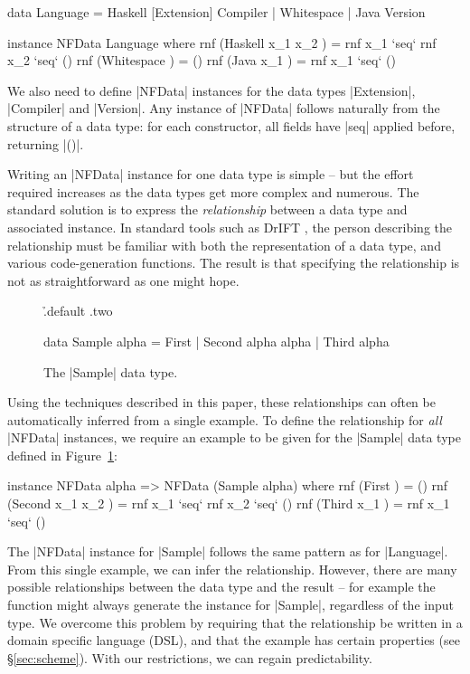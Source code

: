 \documentclass[preprint]{sigplanconf}
\begin{document}
\begin{code}
data Language  =  Haskell [Extension] Compiler
               |  Whitespace
               |  Java Version

instance NFData Language where
    rnf (Haskell x_1 x_2  ) = rnf x_1 `seq` rnf x_2 `seq` ()
    rnf (Whitespace       ) = ()
    rnf (Java x_1         ) = rnf x_1 `seq` ()
\end{code}

We also need to define |NFData| instances for the data types |Extension|, |Compiler| and |Version|. Any instance of |NFData| follows naturally from the structure of a data type: for each constructor, all fields have |seq| applied before, returning |()|.

Writing an |NFData| instance for one data type is simple -- but the effort required increases as the data types get more complex and numerous. The standard solution is to express the \textit{relationship} between a data type and associated instance. In standard tools such as DrIFT \cite{drift}, the person describing the relationship must be familiar with both the representation of a data type, and various code-generation functions. The result is that specifying the relationship is not as straightforward as one might hope.

\begin{figure}
\h{.default .two}\begin{code}
data Sample alpha  =  First
                   |  Second  alpha alpha
                   |  Third   alpha
\end{code}
\caption{The |Sample| data type.}
\label{fig:sample}
\end{figure}

Using the techniques described in this paper, these relationships can often be automatically inferred from a single example. To define the relationship for \textit{all} |NFData| instances, we require an example to be given for the |Sample| data type defined in Figure~\ref{fig:sample}:

\begin{code}
instance NFData alpha => NFData (Sample alpha) where
    rnf (First           ) = ()
    rnf (Second x_1 x_2  ) = rnf x_1 `seq` rnf x_2 `seq` ()
    rnf (Third x_1       ) = rnf x_1 `seq` ()
\end{code}

The |NFData| instance for |Sample| follows the same pattern as for |Language|. From this single example, we can infer the relationship. However, there are many possible relationships between the data type and the result -- for example the function might always generate the instance for |Sample|, regardless of the input type. We overcome this problem by requiring that the relationship be written in a domain specific language (DSL), and that the example has certain properties (see \S\ref{sec:scheme}). With our restrictions, we can regain predictability.
\end{document}
